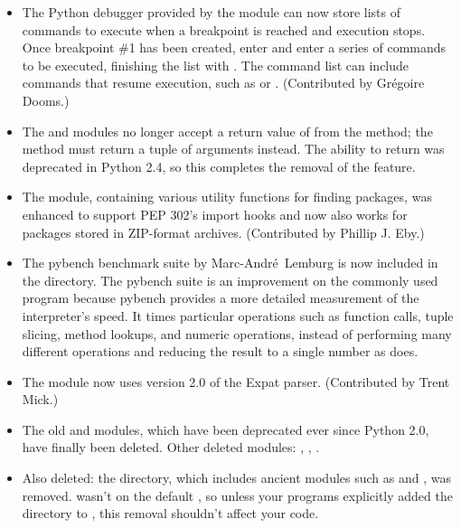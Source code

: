 \documentclass{howto}
\begin{document}
\begin{itemize}
\item The Python debugger provided by the  module
can now store lists of commands to execute when a breakpoint is
reached and execution stops.  Once breakpoint \#1 has been created,
enter  and enter a series of commands to be executed,
finishing the list with .  The command list can include
commands that resume execution, such as  or
.  (Contributed by Gr\'egoire Dooms.)

\item The  and  modules no
longer accept a return value of  from the
 method; the method must return a tuple of
arguments instead.  The ability to return  was deprecated
in Python 2.4, so this completes the removal of the feature.

\item The  module, containing various utility
functions for finding packages, was enhanced to support PEP 302's
import hooks and now also works for packages stored in ZIP-format archives.
(Contributed by Phillip J. Eby.)

\item The pybench benchmark suite by Marc-Andr\'e~Lemburg is now
included in the  directory.  The pybench suite is
an improvement on the commonly used  program because
pybench provides a more detailed measurement of the interpreter's
speed.  It times particular operations such as function calls,
tuple slicing, method lookups, and numeric operations, instead of
performing many different operations and reducing the result to a
single number as  does.

\item The  module now uses version 2.0 of the Expat parser.
(Contributed by Trent Mick.)

\item The old  and  modules, which have been 
deprecated ever since Python 2.0, have finally been deleted.  
Other deleted modules: , ,
.

\item Also deleted: the  directory,
which includes ancient modules such as  and
, was removed.   wasn't on the default
, so unless your programs explicitly added the directory to 
, this removal shouldn't affect your code.


\end{itemize}
\end{document}
